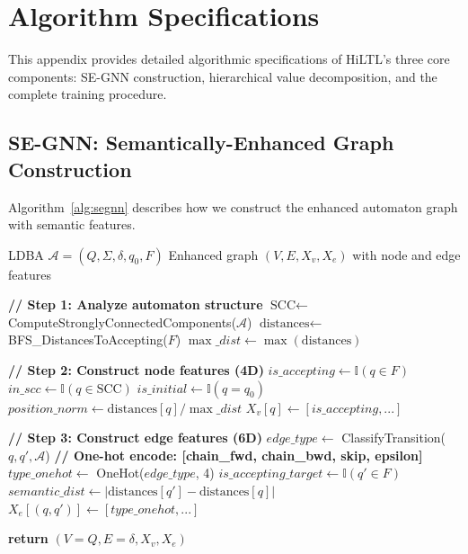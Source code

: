 \documentclass[journal]{IEEEtran}
\begin{document}
\appendices

\section{Algorithm Specifications}
\label{app:algorithms}

This appendix provides detailed algorithmic specifications of HiLTL's three core components: SE-GNN construction, hierarchical value decomposition, and the complete training procedure.

\subsection{SE-GNN: Semantically-Enhanced Graph Construction}

Algorithm~\ref{alg:segnn} describes how we construct the enhanced automaton graph with semantic features.

\begin{algorithm}[h]
\caption{SE-GNN Graph Construction}
\label{alg:segnn}
\begin{algorithmic}[1]
\REQUIRE LDBA $\mathcal{A} = (Q, \Sigma, \delta, q_0, F)$
\ENSURE Enhanced graph $(V, E, X_v, X_e)$ with node and edge features

\STATE \textbf{// Step 1: Analyze automaton structure}
\STATE $\text{SCC} \gets$ ComputeStronglyConnectedComponents($\mathcal{A}$)
\STATE $\text{distances} \gets$ BFS\_DistancesToAccepting($F$)
\STATE $\max\_dist \gets \max(\text{distances})$

\STATE \textbf{// Step 2: Construct node features (4D)}
	\STATE $is\_accepting \gets \mathbb{I}(q \in F)$
	\STATE $in\_scc \gets \mathbb{I}(q \in \text{SCC})$
	\STATE $is\_initial \gets \mathbb{I}(q = q_0)$
	\STATE $position\_norm \gets \text{distances}[q] / \max\_dist$
	\STATE $X_v[q] \gets [is\_accepting, ...]$
\ENDFOR

\STATE \textbf{// Step 3: Construct edge features (6D)}
	\STATE $edge\_type \gets$ ClassifyTransition($q, q', \mathcal{A}$)
	\STATE \textbf{// One-hot encode: [chain\_fwd, chain\_bwd, skip, epsilon]}
	\STATE $type\_onehot \gets$ OneHot($edge\_type$, 4)
	\STATE $is\_accepting\_target \gets \mathbb{I}(q' \in F)$
	\STATE $semantic\_dist \gets |\text{distances}[q'] - \text{distances}[q]|$
	\STATE $X_e[(q, q')] \gets [type\_onehot, ...]$
\ENDFOR

\STATE \textbf{return} $(V=Q, E=\delta, X_v, X_e)$
\end{algorithmic}
\end{algorithm}
\end{document}
